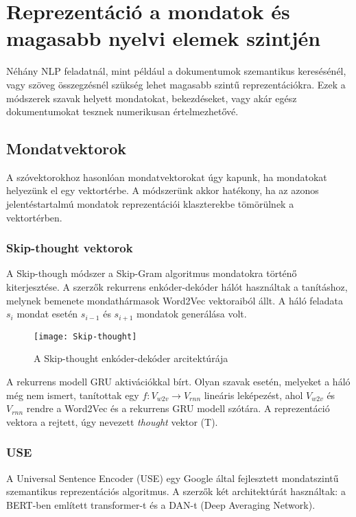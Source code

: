 \section{Reprezentáció a mondatok és magasabb nyelvi elemek szintjén}
Néhány NLP feladatnál, mint például a dokumentumok szemantikus keresésénél, vagy szöveg összegzésnél szükség lehet magasabb szintű reprezentációkra. Ezek a módszerek szavak helyett mondatokat, bekezdéseket, vagy akár egész dokumentumokat tesznek numerikusan értelmezhetővé. 

\subsection{Mondatvektorok}
A szóvektorokhoz hasonlóan mondatvektorokat úgy kapunk, ha mondatokat helyezünk el egy vektortérbe. A módszerünk akkor hatékony, ha az azonos jelentéstartalmú mondatok reprezentációi klaszterekbe tömörülnek a vektortérben.


\subsubsection{Skip-thought vektorok}
A Skip-though módszer a Skip-Gram algoritmus mondatokra történő kiterjesztése. A szerzők rekurrens enkóder-dekóder hálót használtak a tanításhoz, melynek bemenete mondathármasok Word2Vec vektoraiból állt. A háló feladata $s_i$ mondat esetén $s_{i-1}$ és $s_{i+1}$ mondatok generálása volt.

\begin{figure}[H]
	\centering
	\texttt{[image: Skip-thought]}
	\caption{A Skip-thought enkóder-dekóder arcitektúrája}
\end{figure}

A rekurrens modell GRU aktivációkkal bírt.
Olyan szavak esetén, melyeket a háló még nem ismert, tanítottak egy $f:V_{w2v} \rightarrow V_{rnn}$ lineáris leképezést, ahol $V_{w2v}$ és $V_{rnn}$ rendre a Word2Vec és a rekurrens GRU modell szótára. A reprezentáció vektora a rejtett, úgy nevezett \textit{thought} vektor (T).

\subsubsection{USE}
A Universal Sentence Encoder (USE) egy Google által fejlesztett mondatszintű szemantikus reprezentációs algoritmus. A szerzők két architektúrát használtak: a BERT-ben említett transformer-t és a DAN-t (Deep Averaging Network). 

